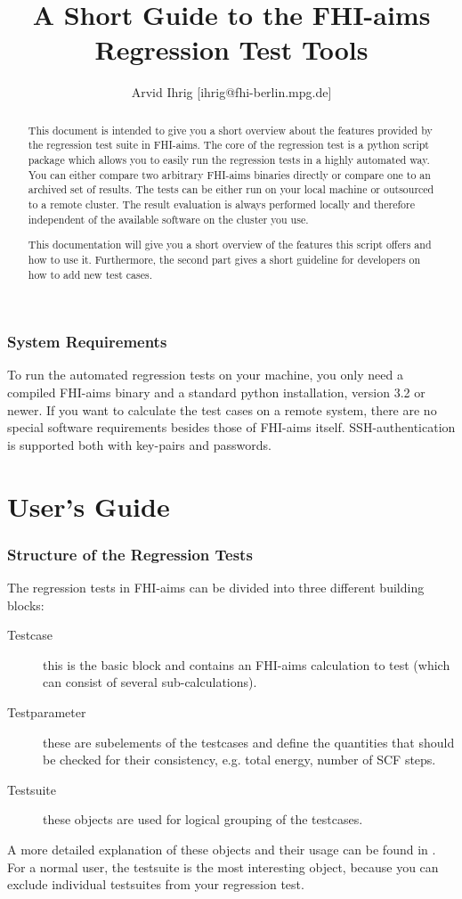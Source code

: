 \documentclass[a4paper,12pt]{scrartcl}
\title{A Short Guide to the FHI-aims Regression Test Tools}
\author{Arvid Ihrig [ihrig@fhi-berlin.mpg.de]}
\begin{document}
\maketitle

\begin{abstract}
This document is intended to give you a short overview about the features provided by the regression test suite in
FHI-aims. The core of the regression test is a python script package which allows you to easily run the regression
tests in a highly automated way. You can either compare two arbitrary FHI-aims binaries directly or compare one to
an archived set of results. The tests can be either run on your local machine or outsourced to a remote cluster. The
result evaluation is always performed locally and therefore independent of the available software on the cluster you
use.

This documentation will give you a short overview of the features this script offers and how to use it. Furthermore,
the second part gives a short guideline for developers on how to add new test cases.
\end{abstract}

\section*{System Requirements}
To run the automated regression tests on your machine, you only need a compiled FHI-aims binary and a standard python
installation, version 3.2 or newer. If you want to calculate the test cases on a remote system, there are no special
software requirements besides those of FHI-aims itself. SSH-authentication is supported both with key-pairs and
passwords.

\newpage
\part{User's Guide}

\section{Structure of the Regression Tests}
The regression tests in FHI-aims can be divided into three different building blocks:
\begin{description}
    \item[Testcase] this is the basic block and contains an FHI-aims calculation to test (which can consist of
        several sub-calculations).
    \item[Testparameter] these are subelements of the testcases and define the quantities that should be checked for
        their consistency, e.g. total energy, number of SCF steps.
    \item[Testsuite] these objects are used for logical grouping of the testcases.
\end{description}
A more detailed explanation of these objects and their usage can be found in . For a normal user,
the testsuite is the most interesting object, because you can exclude individual testsuites from your regression
test.
\end{document}
